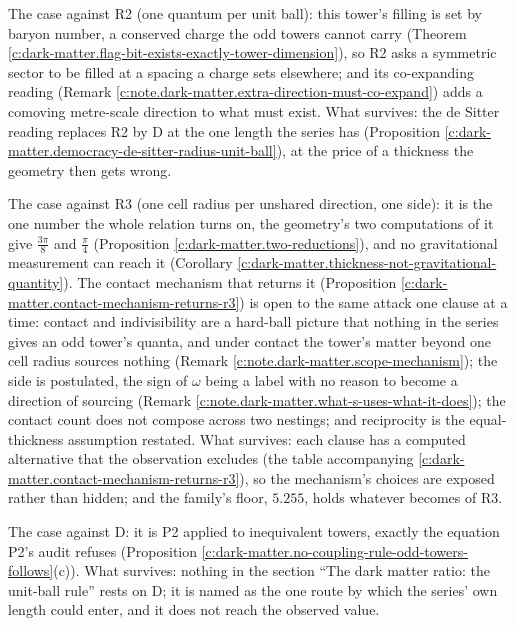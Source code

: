\documentclass[11pt]{article}
\theoremstyle{definition}
\theoremstyle{plain}
\begin{document}
The case against R2 (one quantum per unit ball): this tower's filling is set by baryon number, a conserved charge the odd towers cannot carry (Theorem \ref{c:dark-matter.flag-bit-exists-exactly-tower-dimension}), so R2 asks a symmetric sector to be filled at a spacing a charge sets elsewhere; and its co-expanding reading (Remark \ref{c:note.dark-matter.extra-direction-must-co-expand}) adds a comoving metre-scale direction to what must exist. What survives: the de Sitter reading replaces R2 by D at the one length the series has (Proposition \ref{c:dark-matter.democracy-de-sitter-radius-unit-ball}), at the price of a thickness the geometry then gets wrong.

The case against R3 (one cell radius per unshared direction, one side): it is the one number the whole relation turns on, the geometry's two computations of it give $\tfrac{3\pi}{8}$ and $\tfrac{\pi}{4}$ (Proposition \ref{c:dark-matter.two-reductions}), and no gravitational measurement can reach it (Corollary \ref{c:dark-matter.thickness-not-gravitational-quantity}). The contact mechanism that returns it (Proposition \ref{c:dark-matter.contact-mechanism-returns-r3}) is open to the same attack one clause at a time: contact and indivisibility are a hard-ball picture that nothing in the series gives an odd tower's quanta, and under contact the tower's matter beyond one cell radius sources nothing (Remark \ref{c:note.dark-matter.scope-mechanism}); the side is postulated, the sign of $\omega$ being a label with no reason to become a direction of sourcing (Remark \ref{c:note.dark-matter.what-s-uses-what-it-does}); the contact count does not compose across two nestings; and reciprocity is the equal-thickness assumption restated. What survives: each clause has a computed alternative that the observation excludes (the table accompanying \ref{c:dark-matter.contact-mechanism-returns-r3}), so the mechanism's choices are exposed rather than hidden; and the family's floor, $5.255$, holds whatever becomes of R3.

The case against D: it is P2 applied to inequivalent towers, exactly the equation P2's audit refuses (Proposition \ref{c:dark-matter.no-coupling-rule-odd-towers-follows}(c)). What survives: nothing in the section ``The dark matter ratio: the unit-ball rule'' rests on D; it is named as the one route by which the series' own length could enter, and it does not reach the observed value.
\end{document}
